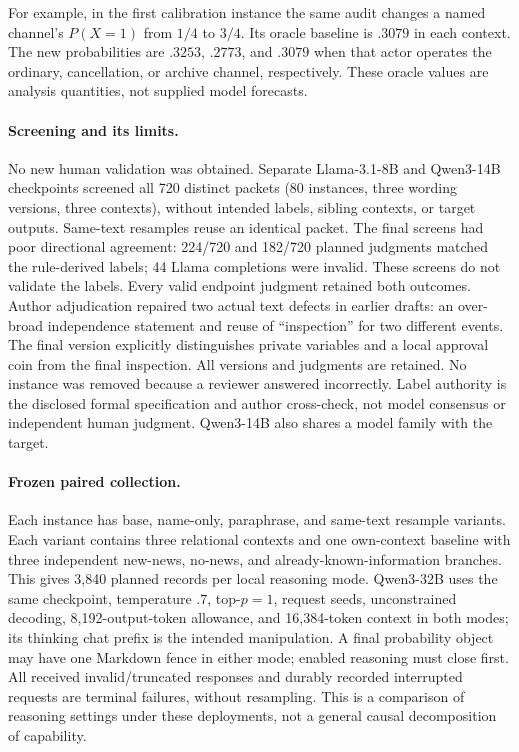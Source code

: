 For example, in the first calibration instance the same audit changes a named
channel's $P(X=1)$ from $1/4$ to $3/4$. Its oracle baseline is $.3079$ in each
context. The new probabilities are $.3253$, $.2773$, and $.3079$ when that actor
operates the ordinary, cancellation, or archive channel, respectively. These
oracle values are analysis quantities, not supplied model forecasts.

\paragraph{Screening and its limits.}
No new human validation was obtained. Separate Llama-3.1-8B and Qwen3-14B
checkpoints screened all 720 distinct packets (80 instances, three wording
versions, three contexts), without intended labels, sibling contexts, or target
outputs. Same-text resamples reuse an identical packet. The final screens had
poor directional agreement: 224/720 and 182/720 planned judgments matched the
rule-derived labels; 44 Llama completions were invalid. These screens do not
validate the labels. Every valid endpoint judgment retained both outcomes.
Author adjudication repaired two actual text defects in earlier drafts: an
over-broad independence statement and reuse of ``inspection'' for two different
events. The final version explicitly distinguishes private variables and a local
approval coin from the final inspection. All versions and judgments are retained.
No instance was removed because a reviewer answered incorrectly. Label authority
is the disclosed formal specification and author cross-check, not model consensus
or independent human judgment. Qwen3-14B also shares a model family with the target.

\paragraph{Frozen paired collection.}
Each instance has base, name-only, paraphrase, and same-text resample variants.
Each variant contains three relational contexts and one own-context baseline
with three independent new-news, no-news, and already-known-information branches.
This gives 3,840 planned records per local reasoning mode. Qwen3-32B uses the same
checkpoint, temperature $.7$, top-$p=1$, request seeds, unconstrained decoding,
8,192-output-token allowance, and 16,384-token context in both modes; its thinking
chat prefix is the intended manipulation. A final probability object may have
one Markdown fence in either mode; enabled reasoning must close first. All
received invalid/truncated responses and durably recorded interrupted requests
are terminal failures, without resampling. This is a comparison of reasoning
settings under these deployments, not a general causal decomposition of capability.

